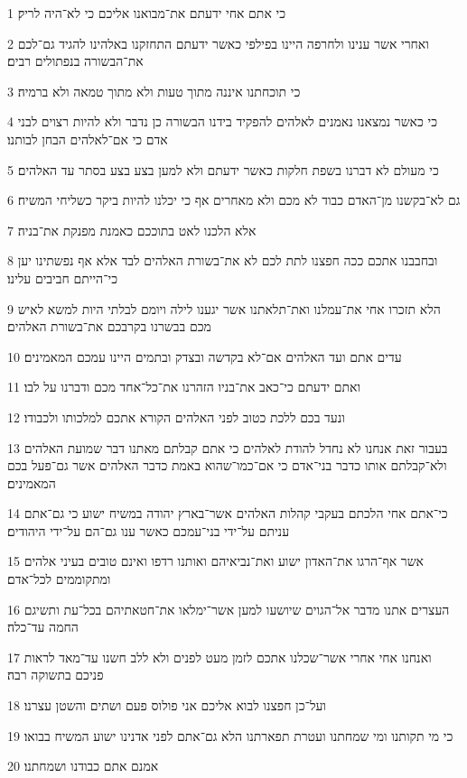 \par 1 כי אתם אחי ידעתם את־מבואנו אליכם כי לא־היה לריק׃
\par 2 ואחרי אשר ענינו ולחרפה היינו בפילפי כאשר ידעתם התחזקנו באלהינו להגיד גם־לכם את־הבשורה בנפתולים רבים׃
\par 3 כי תוכחתנו איננה מתוך טעות ולא מתוך טמאה ולא ברמיה׃
\par 4 כי כאשר נמצאנו נאמנים לאלהים להפקיד בידנו הבשורה כן נדבר ולא להיות רצוים לבני אדם כי אם־לאלהים הבחן לבותנו׃
\par 5 כי מעולם לא דברנו בשפת חלקות כאשר ידעתם ולא למען בצע בצע בסתר עד האלהים׃
\par 6 גם לא־בקשנו מן־האדם כבוד לא מכם ולא מאחרים אף כי יכלנו להיות ביקר כשליחי המשיח׃
\par 7 אלא הלכנו לאט בתוככם כאמנת מפנקת את־בניה׃
\par 8 ובחבבנו אתכם ככה חפצנו לתת לכם לא את־בשורת האלהים לבד אלא אף נפשתינו יען כי־הייתם חביבים עלינו׃
\par 9 הלא תזכרו אחי את־עמלנו ואת־תלאתנו אשר יגענו לילה ויומם לבלתי היות למשא לאיש מכם בבשרנו בקרבכם את־בשורת האלהים׃
\par 10 עדים אתם ועד האלהים אם־לא בקדשה ובצדק ובתמים היינו עמכם המאמינים׃
\par 11 ואתם ידעתם כי־כאב את־בניו הזהרנו את־כל־אחד מכם ודברנו על לבו׃
\par 12 ונעד בכם ללכת כטוב לפני האלהים הקורא אתכם למלכותו ולכבודו׃
\par 13 בעבור זאת אנחנו לא נחדל להודת לאלהים כי אתם קבלתם מאתנו דבר שמועת האלהים ולא־קבלתם אותו כדבר בני־אדם כי אם־כמו־שהוא באמת כדבר האלהים אשר גם־פעל בכם המאמינים׃
\par 14 כי־אתם אחי הלכתם בעקבי קהלות האלהים אשר־בארץ יהודה במשיח ישוע כי גם־אתם עניתם על־ידי בני־עמכם כאשר ענו גם־הם על־ידי היהודים׃
\par 15 אשר אף־הרגו את־האדון ישוע ואת־נביאיהם ואותנו רדפו ואינם טובים בעיני אלהים ומתקוממים לכל־אדם׃
\par 16 העצרים אתנו מדבר אל־הגוים שיושעו למען אשר־ימלאו את־חטאתיהם בכל־עת ותשיגם החמה עד־כלה׃
\par 17 ואנחנו אחי אחרי אשר־שכלנו אתכם לזמן מעט לפנים ולא ללב חשנו עד־מאד לראות פניכם בתשוקה רבה׃
\par 18 ועל־כן חפצנו לבוא אליכם אני פולוס פעם ושתים והשטן עצרנו׃
\par 19 כי מי תקותנו ומי שמחתנו ועטרת תפארתנו הלא גם־אתם לפני אדנינו ישוע המשיח בבואו׃
\par 20 אמנם אתם כבודנו ושמחתנו׃

